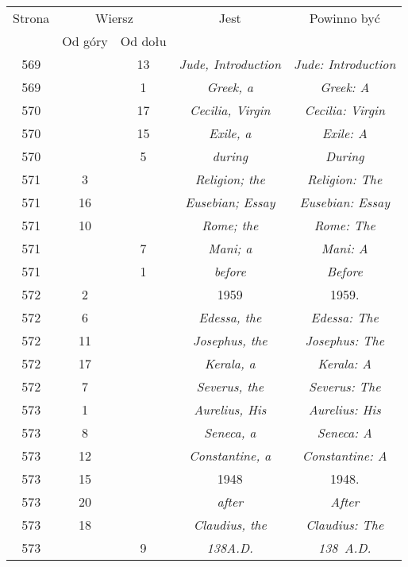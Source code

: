\documentclass[a4paper,11pt]{article}
\numberwithin{equation}{section}
\begin{document}
\begin{center}
  \begin{tabular}{|c|c|c|c|c|}
    \hline
    Strona & \multicolumn{2}{c|}{Wiersz} & Jest
    & Powinno być \\ \cline{2-3}
    & Od góry & Od dołu & & \\
    \hline
    569 & & 13 & \textit{Jude, Introduction}
    & \textit{Jude: Introduction} \\
    569 & & \hphantom{0}1 & \textit{Greek, a} & \textit{Greek: A} \\
    570 & & 17 & \textit{Cecilia, Virgin} & \textit{Cecilia: Virgin} \\
    570 & & 15 & \textit{Exile, a} & \textit{Exile: A} \\
    570 & & \hphantom{0}5 & \textit{during} & \textit{During} \\
    571 & \hphantom{0}3 & & \textit{Religion; the}
    & \textit{Religion: The} \\
    571 & 16 & & \textit{Eusebian; Essay} & \textit{Eusebian: Essay} \\
    571 & 10 & & \textit{Rome; the} & \textit{Rome: The} \\
    571 & & \hphantom{0}7 & \textit{Mani; a} & \textit{Mani: A} \\
    571 & & \hphantom{0}1 & \textit{before} & \textit{Before} \\
    572 & \hphantom{0}2 & & 1959 & 1959. \\
    572 & \hphantom{0}6 & & \textit{Edessa, the} & \textit{Edessa: The} \\
    572 & 11 & & \textit{Josephus, the} & \textit{Josephus: The} \\
    572 & 17 & & \textit{Kerala, a} & \textit{Kerala: A} \\
    572 & \hphantom{0}7 & & \textit{Severus, the} & \textit{Severus: The} \\
    573 & \hphantom{0}1 & & \textit{Aurelius, His}
    & \textit{Aurelius: His} \\
    573 & \hphantom{0}8 & & \textit{Seneca, a} & \textit{Seneca: A} \\
    573 & 12 & & \textit{Constantine, a} & \textit{Constantine: A} \\
    573 & 15 & & 1948 & 1948. \\
    573 & 20 & & \textit{after} & \textit{After} \\
    573 & 18 & & \textit{Claudius, the} & \textit{Claudius: The} \\
    573 & & \hphantom{0}9 & \textit{138A.D.} & \textit{138~A.D.} \\

\end{tabular}
\end{center}
\end{document}
